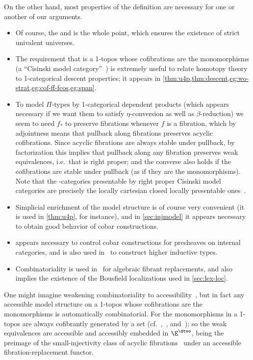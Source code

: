 \begin{verbose}
\begin{rmk}
  On the other hand, most properties of the definition are necessary for one or another of our arguments.
  \begin{itemize}
  \item Of course, the \local and \stratified \nfs is the whole point, which ensures the existence of strict univalent universes.
  \item The requirement that \E is a 1-topos whose cofibrations are the monomorphisms (a ``Cisinski model category''~\cite{cisinski:presheaves,cisinski:local-acyc}) is extremely useful to relate homotopy theory to 1-categorical descent properties; it appears in \cref{thm:u4p,thm:descent,eg:wo-strat,eg:cof-ff-fcos,eg:span}.
  \item To model $\Pi$-types by 1-categorical dependent products (which appears necessary if we want them to satisfy $\eta$-conversion as well as $\beta$-reduction) we seem to need $f_*$ to preserve fibrations whenever $f$ is a fibration, which by adjointness means that pullback along fibrations preserves acyclic cofibrations.
    Since acyclic fibrations are always stable under pullback, by factorization this implies that pullback along any fibration preserves weak equivalences, i.e.\ that \E is right proper; and the converse also holds if the cofibrations are stable under pullback (as if they are the monomorphisms).
    Note that the \io-categories presentable by right proper Cisinski model categories are precisely the locally cartesian closed locally presentable ones~\cite{cisinski:lccc-rpcmc,gk:univlcc}.
  \item Simplicial enrichment of the model structure is of course very convenient (it is used in \cref{thm:u4p}, for instance), and in \cref{sec:injmodel} it appears necessary to obtain good behavior of cobar constructions.
  \item \Slcclosure appears necessary to control cobar constructions for presheaves on internal categories, and is also used in~\cite{ls:hits} to construct higher inductive types.
  \item  Combinatoriality is used in~\cite{ls:hits} for algebraic fibrant replacements, and also implies the existence of the Bousfield localizations used in \cref{sec:lex-loc}.
  \end{itemize}
  One might imagine weakening combinatoriality to accessibility~\cite{rosicky:acc-model}, but in fact any accessible model structure on a 1-topos whose cofibrations are the monomorphisms is automatically combinatorial.
    For the monomorphisms in a 1-topos are always cofibrantly generated by a set (cf.~\cite[Proposition 1.2.27]{cisinski:presheaves},~\cite[Proposition 1.2.2]{cisinski:local-acyc}, and~\cite[Proposition 1.12]{beke:sheafifiable}); so the weak equivalences are accessible and accessibly embedded in $\E^\dtwo$, being the preimage of the small-injectivity class of acyclic fibrations~\cite[Proposition 3.3]{rosicky:comb-model} under an accessible fibration-replacement functor.

\end{rmk}
\end{verbose}
